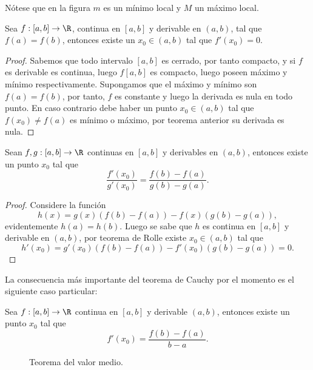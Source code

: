 \documentclass[11pt,oneside,a4paper]{book}
\begin{document}
Nótese que en la figura $m$ es un mínimo local y $M$ un máximo local.
\begin{thm}
Sea $f:[a,b]\rightarrow\R$, continua en $[a,b]$ y derivable en $(a,b)$, tal que $f(a)=f(b)$, entonces existe un $x_0\in(a,b)$ tal que $f'(x_0)=0$.
\end{thm}
\begin{proof}
Sabemos que todo intervalo $[a,b]$ es cerrado, por tanto compacto, y si $f$ es derivable es continua, luego $f[a,b]$ es compacto, luego poseen máximo y mínimo respectivamente. Supongamos que el máximo y mínimo son $f(a)=f(b)$, por tanto, $f$ es constante y luego la derivada es nula en todo punto. En caso contrario debe haber un punto $x_0\in(a,b)$ tal que $f(x_0)\neq f(a)$ es mínimo o máximo, por teorema anterior su derivada es nula.
\end{proof}
\begin{thm}
Sean $f,g:[a,b]\rightarrow\R$ continuas en $[a,b]$ y derivables en $(a,b)$, entonces existe un punto $x_0$ tal que
$$\frac{f'(x_0)}{g'(x_0)}=\frac{f(b)-f(a)}{g(b)-g(a)}.$$
\end{thm}
\begin{proof}
Considere la función
$$h(x)=g(x)\left(f(b)-f(a)\right)-f(x)\left(g(b)-g(a)\right),$$
evidentemente $h(a)=h(b)$. Luego se sabe que $h$ es continua en $[a,b]$ y derivable en $(a,b)$, por teorema de Rolle existe $x_0\in(a,b)$ tal que
$$h'(x_0)=g'(x_0)\left(f(b)-f(a)\right)-f'(x_0)\left(g(b)-g(a)\right)=0.$$
\end{proof}
La consecuencia más importante del teorema de Cauchy por el momento es el siguiente caso particular:
\begin{thm}
Sea $f:[a,b]\rightarrow\R$ continua en $[a,b]$ y derivable $(a,b)$, entonces existe un punto $x_0$ tal que
$$f'(x_0)=\frac{f(b)-f(a)}{b-a}.$$
\end{thm}
\begin{figure}
\centering
{}
\caption{Teorema del valor medio.}
\end{figure}
\end{document}
